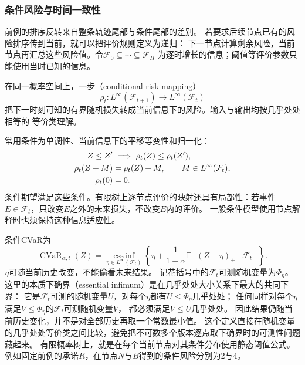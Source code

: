 \subsubsection{条件风险与时间一致性}

前例的排序反转来自整条轨迹尾部与条件尾部的差别。
若要求后续节点已有的风险排序传到当前，就可以把评价规则定义为递归：
下一节点计算剩余风险，当前节点再汇总这些风险值。令$\mathcal F_0\subseteq\cdots\subseteq\mathcal F_H$
为逐时增长的信息；阈值等评价参数只能使用当时已知的信息。
\begin{definition}[一步条件风险映射]
\label{def:decision-conditional-risk-mapping}
在同一概率空间上，一步（conditional risk mapping）
\[
  \rho_t:L^\infty(\mathcal F_{t+1})\longrightarrow L^\infty(\mathcal F_t)
\]
把下一时刻可知的有界随机损失转成当前信息下的风险。输入与输出均按几乎处处相等的
等价类理解。
\end{definition}
常用条件为单调性、当前信息下的平移等变性和归一化：
\begin{align}
  Z\leq Z'&\ \Longrightarrow\ \rho_t(Z)\leq\rho_t(Z'),
  \label{eq:decision-conditional-risk-monotonicity}\\
  \rho_t(Z+M)&=\rho_t(Z)+M,\qquad M\in L^\infty(\mathcal F_t),
  \label{eq:decision-conditional-risk-translation}\\
  \rho_t(0)&=0.\notag
\end{align}
条件期望满足这些条件。有限树上逐节点评价的映射还具有局部性：若事件
$E\in\mathcal F_t$，只改变$E$之外的未来损失，不改变$E$内的评价。
一般条件模型使用节点解释时也须保持这种信息适应性。

条件CVaR为
\begin{equation}
  \operatorname{CVaR}_{\alpha,t}(Z)
  =\operatorname*{ess\,inf}_{\eta\in L^\infty(\mathcal F_t)}
    \left\{\eta+\frac{1}{1-\alpha}
      \mathbb E[(Z-\eta)_+\mid\mathcal F_t]\right\}.
  \label{eq:decision-conditional-cvar}
\end{equation}
$\eta$可随当前历史改变，不能偷看未来结果。
记花括号中的$\mathcal F_t$可测随机变量为$\Phi_\eta$。
这里的本质下确界（essential infimum）是在几乎处处大小关系下最大的共同下界：
它是$\mathcal F_t$可测的随机变量$U$，对每个$\eta$都有$U\leq\Phi_\eta$几乎处处；
任何同样对每个$\eta$满足$V\leq\Phi_\eta$的$\mathcal F_t$可测随机变量$V$，
都必须满足$V\leq U$几乎处处。
因此结果仍随当前历史变化，并不是对全部历史再取一个常数最小值。
这个定义直接在随机变量的几乎处处等价类之间比较，避免把不可数多个版本逐点取下确界时的可测性问题藏起来。
有限概率树上，就是在每个当前节点对其条件分布使用静态阈值公式。
例如固定前例的承诺$R$，在节点$N$与$B$得到的条件风险分别为$2$与$4$。

